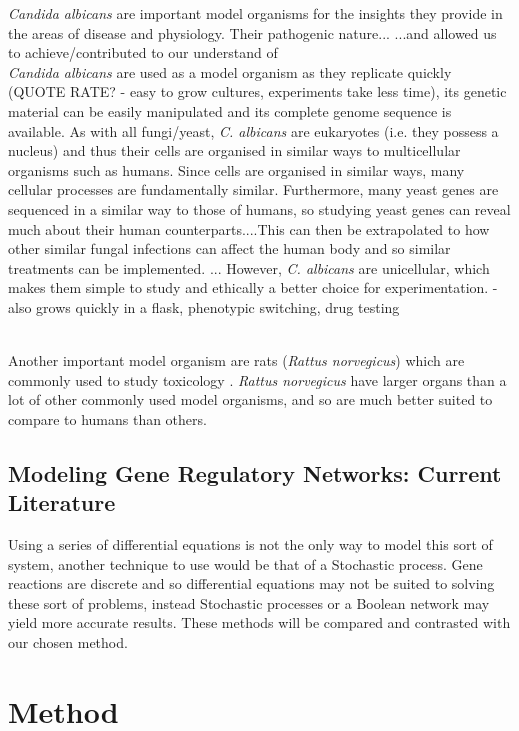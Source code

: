\documentclass[]{article}
\begin{document}
\textit{Candida albicans} are important model organisms for the insights they provide in the areas of disease and physiology. Their pathogenic nature... %
...and allowed us to achieve/contributed to our understand of %
\\
\textit{Candida albicans} are used as a model organism as they replicate quickly (QUOTE RATE? - easy to grow cultures, experiments take less time), its genetic material can be easily manipulated and its complete genome sequence is available\cite{kabir2012candida}. As with all fungi/yeast, \textit{C. albicans} are eukaryotes (i.e. they possess a nucleus) and thus their cells are organised in similar ways to multicellular organisms such as humans. %
Since cells are organised in similar ways, many cellular processes are fundamentally similar. Furthermore, many yeast genes are sequenced in a similar way to those of humans, so studying yeast genes can reveal much about their human counterparts....This can then be extrapolated to how other similar fungal infections can affect the human body and so similar treatments can be implemented. ... However, \textit{C. albicans} are unicellular, which makes them simple to study and ethically a better choice for experimentation. 
- also grows quickly in a flask, phenotypic switching, drug testing


\\
Another important model organism are rats (\textit{Rattus norvegicus}) which are commonly used to study toxicology \cite{athanazio2008rattus}. \textit{Rattus norvegicus} have larger organs than a lot of other commonly used model organisms, and so are much better suited to compare to humans than others.


   \subsection{Modeling Gene Regulatory Networks: Current Literature}
   Using a series of differential equations is not the only way to model this sort of system, another technique to use would be that of a Stochastic process. Gene reactions are discrete and so differential equations may not be suited to solving these sort of problems, instead Stochastic processes or a Boolean network may yield more accurate results. These methods will be compared and contrasted with our chosen method.%

\pagebreak

\section{Method}
\end{document}
